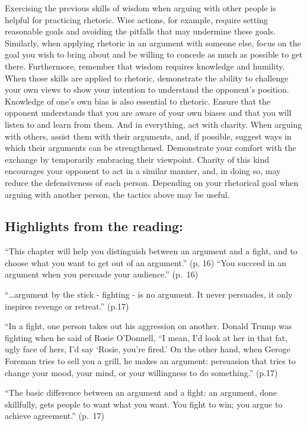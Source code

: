 \documentclass[
]{book}
\begin{document}
Exercising the previous skills of wisdom when arguing with other people is helpful for practicing rhetoric. Wise actions, for example, require setting reasonable goals and avoiding the pitfalls that may undermine these goals. Similarly, when applying rhetoric in an argument with someone else, focus on the goal you wish to bring about and be willing to concede as much as possible to get there. Furthermore, remember that wisdom requires knowledge and humility. When those skills are applied to rhetoric, demonstrate the ability to challenge your own views to show your intention to understand the opponent's position. Knowledge of one's own bias is also essential to rhetoric. Ensure that the opponent understands that you are aware of your own biases and that you will listen to and learn from them. And in everything, act with charity. When arguing with others, assist them with their arguments, and, if possible, suggest ways in which their arguments can be strengthened. Demonstrate your comfort with the exchange by temporarily embracing their viewpoint. Charity of this kind encourages your opponent to act in a similar manner, and, in doing so, may reduce the defensiveness of each person. Depending on your rhetorical goal when arguing with another person, the tactics above may be useful.

\hypertarget{highlights-from-the-reading-4}{%
\subsection{Highlights from the reading:}\label{highlights-from-the-reading-4}}

``This chapter will help you distinguish between an argument and a fight, and to choose what you want to get out of an argument.'' (p, 16)
``You succeed in an argument when you persuade your audience.'' (p.~16)

``\ldots argument by the stick - fighting - is no argument. It never persuades, it only inspires revenge or retreat.'' (p.17)

``In a fight, one person takes out his aggression on another. Donald Trump was fighting when he said of Rosie O'Donnell, ``I mean, I'd look at her in that fat, ugly face of hers, I'd say `Rosie, you're fired.' On the other hand, when Geroge Foreman tries to sell you a grill, he makes an argument: persuasion that tries to change your mood, your mind, or your willingness to do something.'' (p.17)

``The basic difference between an argument and a fight: an argument, done skillfully, gets people to want what you want. You fight to win; you argue to achieve agreement.'' (p.~17)
\end{document}
